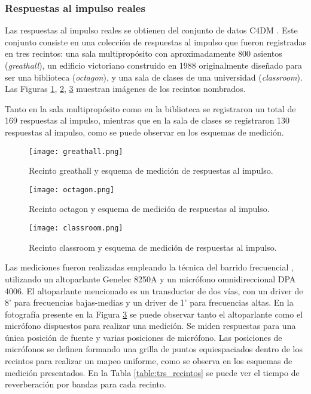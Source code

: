 \subsubsection{Respuestas al impulso reales}

Las respuestas al impulso reales se obtienen del conjunto de datos C4DM \cite{rir_reales}. Este conjunto consiste en una colección de respuestas al impulso que fueron registradas en tres recintos: una sala multipropósito con aproximadamente 800 asientos (\textit{greathall}), un edificio victoriano construido en 1988 originalmente diseñado para ser una biblioteca (\textit{octagon}), y una sala de clases de una universidad (\textit{classroom}). Las Figuras \ref{fig:sala1}, \ref{fig:sala2}, \ref{fig:sala3} muestran imágenes de los recintos nombrados. 

Tanto en la sala multipropósito como en la biblioteca se registraron un total de 169 respuestas al impulso, mientras que en la sala de clases se registraron 130 respuestas al impulso, como se puede observar en los esquemas de medición. 

\begin{figure}[H]
	\centering{}
	\texttt{[image: greathall.png]}
	\caption{Recinto greathall y esquema de medición de respuestas al impulso.}
	\label{fig:sala1}
\end{figure}

\begin{figure}[H]
	\centering{}
	\texttt{[image: octagon.png]}
	\caption{Recinto octagon y esquema de medición de respuestas al impulso.}
	\label{fig:sala2}
\end{figure}

\begin{figure}[H]
	\centering{}
	\texttt{[image: classroom.png]}
	\caption{Recinto classroom y esquema de medición de respuestas al impulso.}
	\label{fig:sala3}
\end{figure}



Las mediciones fueron realizadas empleando la técnica del barrido frecuencial \cite{sinesweep}, utilizando un altoparlante Genelec 8250A y un micrófono omnidireccional DPA 4006. El altoparlante mencionado es un transductor de dos vías, con un driver de 8' para frecuencias bajas-medias y un driver de 1' para frecuencias altas. En la fotografía presente en la Figura \ref{fig:sala3} se puede observar tanto el altoparlante como el micrófono dispuestos para realizar una medición.  Se miden respuestas para una única posición de fuente y varias posiciones de micrófono. Las posiciones de micrófonos se definen formando una grilla de puntos equiespaciados dentro de los recintos para realizar un mapeo uniforme, como se observa en los esquemas de medición presentados. En la Tabla \ref{table:trs_recintos} se puede ver el tiempo de reverberación por bandas para cada recinto. 


